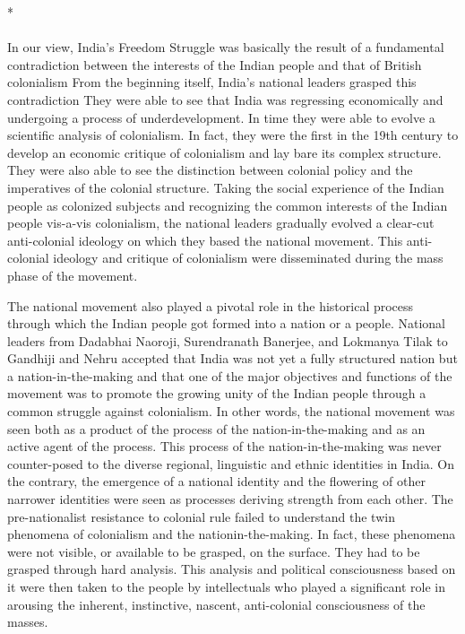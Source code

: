 \begin{center}*\end{center}

\paragraph*{}
In our view, India's Freedom Struggle was basically the result of a fundamental contradiction between the interests of the Indian people and that of British colonialism From the beginning itself, India's national leaders grasped this contradiction They were able to see that India was regressing economically and undergoing a process of underdevelopment. In time they were able to evolve a scientific analysis of colonialism. In fact, they were the first in the 19th century to develop an economic critique of colonialism and lay bare its complex structure. They were also able to see the distinction between colonial policy and the imperatives of the colonial structure. Taking the social experience of the Indian people as colonized subjects and recognizing the common interests of the Indian people vis-a-vis colonialism, the national leaders gradually evolved a clear-cut anti-colonial ideology on which they based the national movement. This anti-colonial ideology and critique of colonialism were disseminated during the mass phase of the movement.

The national movement also played a pivotal role in the historical process through which the Indian people got formed into a nation or a people. National leaders from Dadabhai Naoroji, Surendranath Banerjee, and Lokmanya Tilak to Gandhiji and Nehru accepted that India was not yet a fully structured nation but a nation-in-the-making and that one of the major objectives and functions of the movement was to promote the growing unity of the Indian people through a common struggle against colonialism. In other words, the national movement was seen both as a product of the process of the nation-in-the-making and as an active agent of the process. This process of the nation-in-the-making was never counter-posed to the diverse regional, linguistic and ethnic identities in India. On the contrary, the emergence of a national identity and the flowering of other narrower identities were seen as processes deriving strength from each other. The pre-nationalist resistance to colonial rule failed to understand the twin phenomena of colonialism and the nation­in-the-making. In fact, these phenomena were not visible, or available to be grasped, on the surface. They had to be grasped through hard analysis. This analysis and political consciousness based on it were then taken to the people by intellectuals who played a significant role in arousing the inherent, instinctive, nascent, anti-colonial consciousness of the masses.

